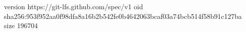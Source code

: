 version https://git-lfs.github.com/spec/v1
oid sha256:953f952aa0f98dfa8a16b2b542fe0b4642063bcaf03a74bcb514f58b91c127ba
size 196704
